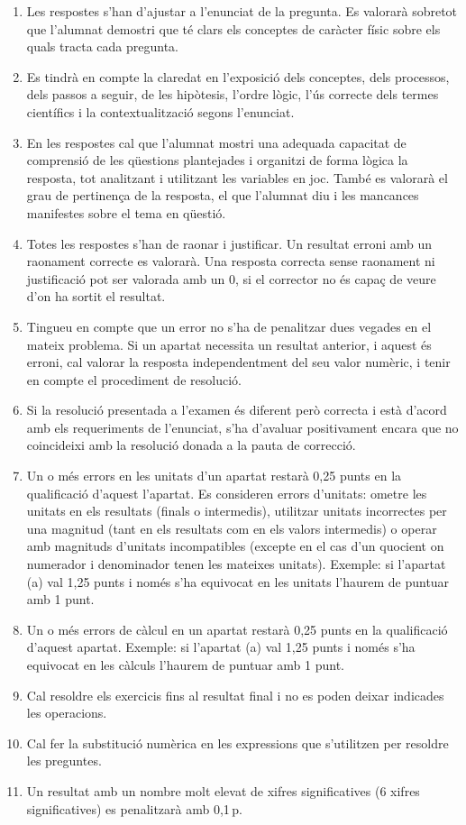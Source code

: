 \begin{enumerate}
  \item Les respostes s'han d'ajustar a l'enunciat de la pregunta. Es valorarà sobretot que l'alumnat demostri que té clars els conceptes de caràcter físic sobre els quals tracta cada pregunta.
  \item Es tindrà en compte la claredat en l'exposició dels conceptes, dels processos, dels passos a seguir, de les hipòtesis, l'ordre lògic, l'ús correcte dels termes científics i la contextualització segons l'enunciat.
  \item En les respostes cal que l'alumnat mostri una adequada capacitat de comprensió de les qüestions plantejades i organitzi de forma lògica la resposta, tot analitzant i utilitzant les variables en joc. També es valorarà el grau de pertinença de la resposta, el que l'alumnat diu i les mancances manifestes sobre el tema en qüestió.
  \item Totes les respostes s'han de raonar i justificar. Un resultat erroni amb un raonament correcte es valorarà. Una resposta correcta sense raonament ni justificació pot ser valorada amb un 0, si el corrector no és capaç de veure d'on ha sortit el resultat.
  \item Tingueu en compte que un error no s'ha de penalitzar dues vegades en el mateix problema. Si un apartat necessita un resultat anterior, i aquest és erroni, cal valorar la resposta independentment del seu valor numèric, i tenir en compte el procediment de resolució.
  \item Si la resolució presentada a l'examen és diferent però correcta i està d'acord amb els requeriments de l'enunciat, s'ha d'avaluar positivament encara que no coincideixi amb la resolució donada a la pauta de correcció.
  \item Un o més errors en les unitats d'un apartat restarà 0,25 punts en la qualificació d'aquest l'apartat. Es consideren errors d'unitats: ometre les unitats en els resultats (finals o intermedis), utilitzar unitats incorrectes per una magnitud (tant en els resultats com en els valors intermedis) o operar amb magnituds d'unitats incompatibles (excepte en el cas d'un quocient on numerador i denominador tenen les mateixes unitats). Exemple: si l'apartat (a) val 1,25 punts i només s'ha equivocat en les unitats l'haurem de puntuar amb 1 punt.
  \item Un o més errors de càlcul en un apartat restarà 0,25 punts en la qualificació d'aquest apartat. Exemple: si l'apartat (a) val 1,25 punts i només s'ha equivocat en les càlculs l'haurem de puntuar amb 1 punt.
  \item Cal resoldre els exercicis fins al resultat final i no es poden deixar indicades les operacions.
  \item Cal fer la substitució numèrica en les expressions que s'utilitzen per resoldre les preguntes.
  \item Un resultat amb un nombre molt elevat de xifres significatives (6 xifres significatives) es penalitzarà amb 0,1\,p.
\end{enumerate}
